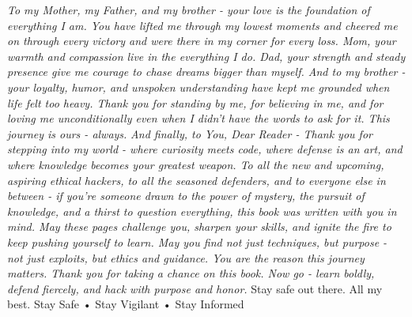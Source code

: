 \textit{To my Mother, my Father, and my brother - your love is the foundation of everything I am. You have lifted me through my lowest moments and cheered me on through every victory and were there in my corner for every loss. Mom, your warmth and compassion live in the everything I do. Dad, your strength and steady presence give me courage to chase dreams bigger than myself. And to my brother - your loyalty, humor, and unspoken understanding have kept me grounded when life felt too heavy. Thank you for standing by me, for believing in me, and for loving me unconditionally even when I didn't have the words to ask for it. This journey is ours - always.
}
\textit{And finally, to You, Dear Reader - Thank you for stepping into my world - where curiosity meets code, where defense is an art, and where knowledge becomes your greatest weapon. To all the new and upcoming, aspiring ethical hackers, to all the seasoned defenders, and to everyone else in between - if you're someone drawn to the power of mystery, the pursuit of knowledge, and a thirst to question everything, this book was written with you in mind. May these pages challenge you, sharpen your skills, and ignite the fire to keep pushing yourself to learn. May you find not just techniques, but purpose - not just exploits, but ethics and guidance. You are the reason this journey matters. Thank you for taking a chance on this book. Now go - learn boldly, defend fiercely, and hack with purpose and honor.
}
Stay safe out there.
All my best.
Stay Safe • Stay Vigilant • Stay Informed